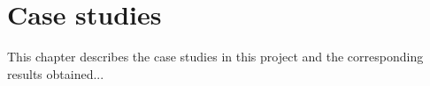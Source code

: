 \normalfont\normalsize
\chapter{Case studies}

This chapter describes the case studies in this project and the corresponding results obtained...



